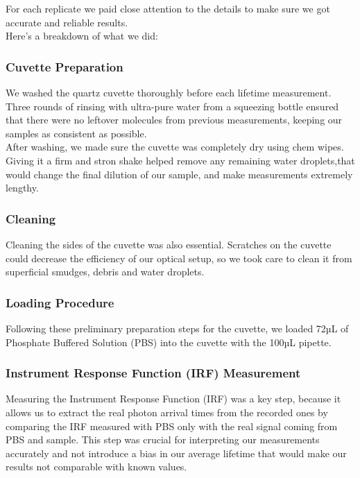 \documentclass[a4paper,english,12pt,bibliography=totoc]{scrreprt}
\begin{document}
For each replicate we paid close attention to the details to make sure we got accurate and reliable results.\\

Here's a breakdown of what we did:\\

\subsubsection{Cuvette Preparation}
We washed the quartz cuvette thoroughly before each lifetime measurement. Three rounds of rinsing with ultra-pure water from a squeezing bottle ensured that there were no leftover molecules from previous measurements, keeping our samples as consistent as possible.\\

After washing, we made sure the cuvette was completely dry using chem wipes. Giving it a firm and stron shake helped remove any remaining water droplets,that would change the final dilution of our sample, and make measurements extremely lengthy.\\
\subsubsection{Cleaning}
Cleaning the sides of the cuvette was also essential. Scratches on the cuvette could decrease the efficiency of our optical setup, so we took care to clean it from superficial smudges, debris and water droplets.\\
\subsubsection{Loading Procedure}
Following these preliminary preparation steps for the cuvette, we loaded 72µL of Phosphate Buffered Solution (PBS) into the cuvette with the 100µL pipette. \\
\subsubsection{Instrument Response Function (IRF) Measurement}
Measuring the Instrument Response Function (IRF) was a key step, because it allows us to extract the real photon arrival times from the recorded ones by comparing the IRF measured with PBS only with the real signal coming from PBS and sample. This step was crucial for interpreting our measurements accurately and not introduce a bias in our average lifetime that would make our results not comparable with known values.\\
\end{document}
